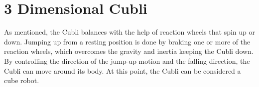 \section{3 Dimensional Cubli}

As mentioned, the Cubli balances with the help of reaction wheels that spin up or down. Jumping up from a resting position is done by braking one or more of the reaction wheels, which overcomes the gravity and inertia keeping the Cubli down.
By controlling the direction of the jump-up motion and the falling direction, the Cubli can move around its body. At this point, the Cubli can be considered a cube robot.\\